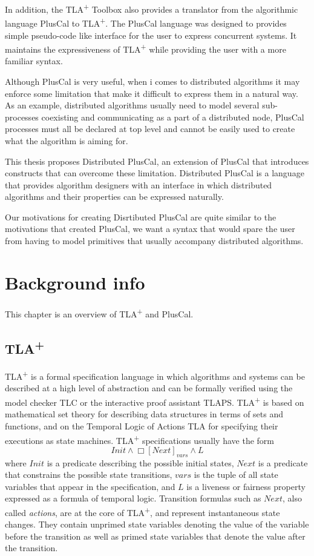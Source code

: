\documentclass{thesul}
\newcommand{\tlaplus}{TLA\textsuperscript{+}\xspace}
\begin{document}
In addition, the \tlaplus Toolbox also provides a translator from the algorithmic language PlusCal to \tlaplus. The PlusCal language was designed to provides simple pseudo-code like interface for the user to express concurrent systems. It maintains the expressiveness of \tlaplus while providing the user with a more familiar syntax.

Although PlusCal is very useful, when i comes to distributed algorithms it may enforce some limitation that make it difficult to express them in a natural way. As an example, distributed algorithms usually need to model several sub-processes coexisting and communicating as a part of a distributed node, PlusCal processes must all be declared at top level and cannot be easily used to create what the algorithm is aiming for. 

This thesis proposes Distributed PlusCal, an extension of PlusCal that introduces constructs that can overcome these limitation. Distributed PlusCal is a language that provides algorithm designers with an interface in which distributed algorithms and their properties can be expressed naturally.

Our motivations for creating Disrtibuted PlusCal are quite similar to the motivations that created PlusCal, we want a syntax that would spare the user from having to model primitives that usually accompany distributed algorithms.


\chapter{Background info}

This chapter is an overview of \tlaplus and PlusCal.
\section{\tlaplus}

\tlaplus is a formal specification language in which algorithms and systems can be described at a high level of abstraction and can be formally verified using the model checker TLC or the interactive proof assistant TLAPS. \tlaplus is based on mathematical set theory for describing data structures in terms of sets and functions, and on the Temporal Logic of Actions TLA for specifying their executions as state machines. \tlaplus specifications usually have the form
\[
  Init \land \Box[Next]_{vars} \land L
\]
where $Init$ is a predicate describing the possible initial states, $Next$ is a predicate that constrains the possible state transitions, $vars$ is the tuple of all state variables that appear in the specification, and $L$ is a liveness or fairness property expressed as a formula of temporal logic. Transition formulas such as $Next$, also called \emph{actions}, are at the core of \tlaplus, and represent instantaneous state changes. They contain unprimed state variables denoting the value of the variable before the transition as well as primed state variables that denote the value after the transition.
\end{document}
